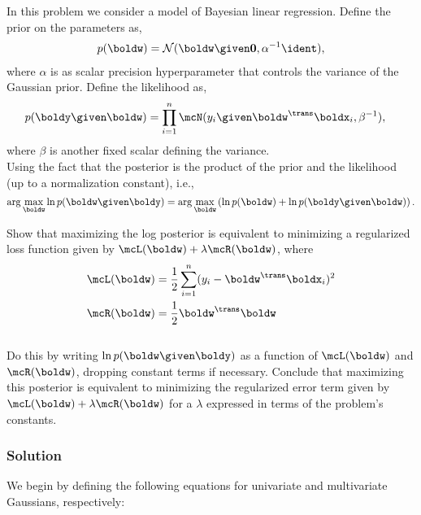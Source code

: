 \documentclass[submit]{harvardml}
\begin{document}
\newpage
\begin{problem}
In this problem we consider a model of Bayesian linear regression. Define the prior on the parameters as,
\begin{align*}
p(\boldw) = \mathcal{N}(\boldw \given \bold0, \alpha^{-1}\ident ),
\end{align*}
where $\alpha$ is as scalar precision hyperparameter that controls the variance of the Gaussian prior.  Define the likelihood as,
\begin{align*}
p(\boldy \given \boldw) &= \prod_{i=1}^n \mcN(y_i \given \boldw^\trans \boldx_i, \beta^{-1}),
\end{align*}
where $\beta$ is another fixed scalar defining the variance. \\


\noindent Using the fact that the posterior is the product of the prior and the likelihood (up to a normalization constant), i.e., 
\[\arg\max_{\boldw} \ln p(\boldw \given \boldy)= \arg\max_{\boldw} \left( \ln p(\boldw) + \ln p(\boldy \given \boldw)\right) .\]

\noindent Show that maximizing the log posterior is equivalent to minimizing a regularized loss function given by ${\mcL(\boldw) + \lambda \mcR(\boldw)}$, where
\begin{align*}
\mcL(\boldw) &= \frac{1}{2}\sum_{i = 1}^n (y_i - \boldw^\trans \boldx_i)^2 \\
\mcR(\boldw) &= \frac{1}{2}\boldw^\trans \boldw
\end{align*} \\

\noindent Do this by writing $\ln p(\boldw \given \boldy)$ as a function of $\mcL(\boldw)$ and $\mcR(\boldw)$, dropping constant terms if necessary.  Conclude that maximizing this posterior is equivalent to minimizing the regularized error term given by $\mcL(\boldw) + \lambda \mcR(\boldw)$ for a $\lambda$ expressed in terms of the problem's constants.  
\end{problem}


\subsubsection*{Solution}
We begin by defining the following equations for univariate and multivariate Gaussians, respectively:
\end{document}
